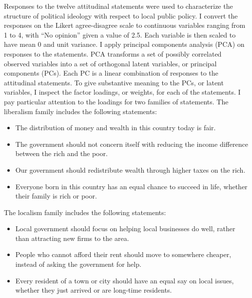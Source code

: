 \documentclass[article,11pt]{memoir}
\begin{document}
Responses to the twelve attitudinal statements were used to characterize the structure of political ideology with respect to local public policy.  I convert the responses on the Likert agree-disagree scale to continuous variables ranging from 1 to 4, with ``No opinion'' given a value of 2.5.  Each variable is then scaled to have mean 0 and unit variance.  I  apply principal components analysis (PCA) on responses to the statements. PCA transforms a set of possibly correlated observed variables into a set of orthogonal latent variables, or principal components (PCs).  Each PC is a linear combination of responses to the attitudinal statements. To give substantive meaning to the PCs, or latent variables, I inspect the factor loadings, or weights, for each of the statements.  I pay particular attention to the loadings for two families of statements.  The liberalism family includes the following statements:

\begin{itemize}
  \item The distribution of money and wealth in this country today is fair.
  \item The government should not concern itself with reducing the income difference between the rich and the poor.
  \item Our government should redistribute wealth through higher taxes on the rich.
  \item Everyone born in this country has an equal chance to succeed in life, whether their family is rich or poor.
\end{itemize}

The localism family includes the following statements:

\begin{itemize}
  \item Local government should focus on helping local businesses do well, rather than attracting new firms to the area.
  \item People who cannot afford their rent should move to somewhere cheaper, instead of asking the government for help.
  \item Every resident of a town or city should have an equal say on local issues, whether they just arrived or are long-time residents.
\end{itemize}
\end{document}
